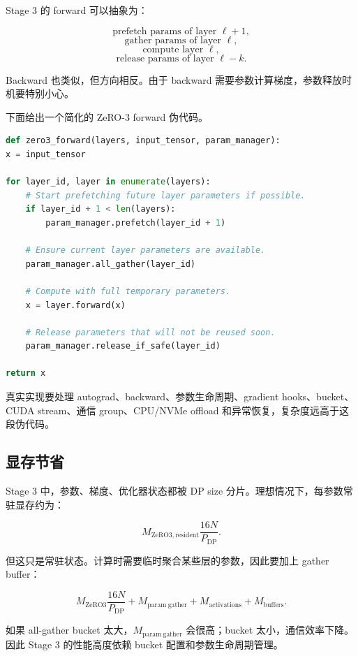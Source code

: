Stage 3 的 forward 可以抽象为：

\[
\text{prefetch params of layer }\ell+1,
\]
\[
\text{gather params of layer }\ell,
\]
\[
\text{compute layer }\ell,
\]
\[
\text{release params of layer }\ell-k.
\]

Backward 也类似，但方向相反。由于 backward 需要参数计算梯度，参数释放时机要特别小心。

下面给出一个简化的 ZeRO-3 forward 伪代码。

\begin{lstlisting}[language=Python,caption={ZeRO Stage 3 forward 中参数 gather/prefetch/release 的伪代码},label={lst:zero3-forward-pseudocode}]
def zero3_forward(layers, input_tensor, param_manager):
x = input_tensor

for layer_id, layer in enumerate(layers):
    # Start prefetching future layer parameters if possible.
    if layer_id + 1 < len(layers):
        param_manager.prefetch(layer_id + 1)

    # Ensure current layer parameters are available.
    param_manager.all_gather(layer_id)

    # Compute with full temporary parameters.
    x = layer.forward(x)

    # Release parameters that will not be reused soon.
    param_manager.release_if_safe(layer_id)

return x

\end{lstlisting}

真实实现要处理 autograd、backward、参数生命周期、gradient hooks、bucket、CUDA stream、通信 group、CPU/NVMe offload 和异常恢复，复杂度远高于这段伪代码。

\subsection{显存节省}
\label{subsec:zero3-memory-saving}

Stage 3 中，参数、梯度、优化器状态都被 DP size 分片。理想情况下，每参数常驻显存约为：

\[
M_{\mathrm{ZeRO3,resident}}
\frac{16N}{P_{\mathrm{DP}}}.
\]

但这只是常驻状态。计算时需要临时聚合某些层的参数，因此要加上 gather buffer：

\[
M_{\mathrm{ZeRO3}}
\frac{16N}{P_{\mathrm{DP}}}
+
M_{\mathrm{param\ gather}}
+
M_{\mathrm{activations}}
+
M_{\mathrm{buffers}}.
\]

如果 all-gather bucket 太大，$M_{\mathrm{param\ gather}}$ 会很高；bucket 太小，通信效率下降。因此 Stage 3 的性能高度依赖 bucket 配置和参数生命周期管理。

